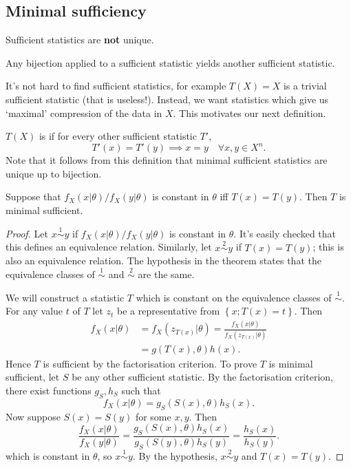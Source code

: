 \documentclass[a4paper]{scrartcl}
\begin{document}
\subsection{Minimal sufficiency}
Sufficient statistics are \textbf{not} unique. 
\begin{remark}
      Any bijection applied to a sufficient statistic yields another sufficient statistic.
\end{remark}
It's not hard to find sufficient statistics, for example $T (X)=X$ is a trivial sufficient statistic (that is useless!). Instead, we want statistics which give us `maximal' compression of the data in $X$. This motivates our next definition.
\begin{definition*}
      $T (X)$ is  if for every other sufficient statistic $T'$, \[
      T' (x)=T' (y) \implies x=y \quad \forall x,y \in X^{n}
      .\] Note that it follows from this definition that minimal sufficient statistics are unique up to bijection.
\end{definition*}
\begin{theorem}
      Suppose that $f_{X}(x| \theta)/f_{X}(y| \theta)$ is constant in $\theta$ iff $T (x)= T (y)$. Then $T$ is minimal sufficient.
\end{theorem}
\begin{proof}
      Let $x \overset{1}{\sim}  y$ if $f_{X}(x| \theta)/f_{X}(y| \theta)$ is constant in $\theta$. It's easily checked that this defines an equivalence relation. Similarly, let $x \overset{2}{\sim} y$ if $T (x)=T (y)$; this is also an equivalence relation. The hypothesis in the theorem states that the equivalence classes of $\overset{1}{\sim} $ and $\overset{2}{\sim} $ are the same. 
      
      We will construct a statistic $T$ which is constant on the equivalence classes of $\overset{1}{\sim} $. For any value $t$ of $T$ let $z_{t}$ be a representative from $\left\{x; T (x)=t\right\}$. Then
      \begin{align*}
           f_{X}(x| \theta)&=f_{X}(z_{T (x)}|\theta)= \frac{f_{X}(x|\theta)}{f_{X}(z_{T (x)}| \theta)}\\
           &=g (T (x), \theta) h (x).
      \end{align*}
      Hence $T$ is sufficient by the factorisation criterion. To prove $T$ is minimal sufficient, let $S$ be any other sufficient statistic. By the factorisation criterion, there exist functions $g_{S}, h_{S}$ such that \[
      f_{X}(x| \theta)=g_{S}(S (x),\theta)h_{S}(x)
      .\] Now suppose $S (x)=S (y)$ for some $x,y$. Then \[
          \frac{f_{X}(x|\theta)}{f_{X}(y| \theta)}= \frac{g_{S}(S (x),\theta)h_{S}(x)}{g_{S}(S (y),\theta)h_{S}(y)}= \frac{h_{S}(x)}{h_{S}(y)}
      .\] which is constant in $\theta$, so $x \overset{1}{\sim} y$. By the hypothesis, $x \overset{2}{\sim} y$ and $T (x)=T (y)$. 
\end{proof}
\end{document}
